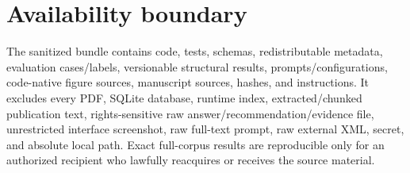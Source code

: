 \section{Availability boundary}

The sanitized bundle contains code, tests, schemas, redistributable metadata, evaluation cases/labels, versionable structural results, prompts/configurations, code-native figure sources, manuscript sources, hashes, and instructions. It excludes every PDF, SQLite database, runtime index, extracted/chunked publication text, rights-sensitive raw answer/recommendation/evidence file, unrestricted interface screenshot, raw full-text prompt, raw external XML, secret, and absolute local path. Exact full-corpus results are reproducible only for an authorized recipient who lawfully reacquires or receives the source material.
